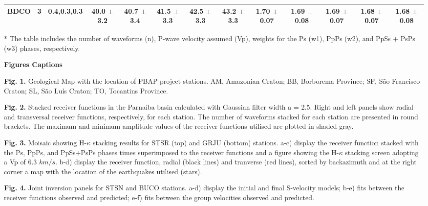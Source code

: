 \documentclass[paper,11pt]{geophysics}
\begin{document}
\begin{landscape}
\begin{table}[! htpb]
\begin{threeparttable}
\begin{tabular}{ccc|ccccc|ccccc}
BDCO & 3 & 0.4,0.3,0.3 & 40.0 $\pm$ 3.2 & 40.7 $\pm$ 3.4 & 41.5 $\pm$ 3.3 & 42.5 $\pm$ 3.3 & 43.2 $\pm$ 3.3  & 1.70 $\pm$ 0.07 & 1.69 $\pm$ 0.08 & 1.69 $\pm$ 0.07 & 1.68 $\pm$ 0.07 & 1.68 $\pm$ 0.08 \\ \hline
\end{tabular}
	\begin{tablenotes}\footnotesize
	\item[*] The table includes the number of waveforms (n), P-wave velocity assumed (Vp), weights for the Ps (w1), PpPs (w2), and PpSs + PsPs (w3) phases, respectively.
    \end{tablenotes}
    \label{tabela_hk_stacking}
	\end{threeparttable}
\end{table}
\end{landscape}



\pagebreak
\begin{flushleft}
\textbf{\LARGE Figures Captions}
\end{flushleft}

\textbf{Fig. 1.} Geological Map with the location of PBAP project stations. AM, Amazonian Craton; BB, Borborema Province; SF, São Francisco Craton; SL, São Luís Craton; TO, Tocantins Province.

\textbf{Fig. 2.} Stacked receiver functions in the Parnaíba basin calculated with Gaussian filter width a = 2.5. Right and left panels show radial and transversal receiver functions, respectively, for each station. The number of waveforms stacked for each station are presented in round brackets. The maximum and minimum amplitude values of the receiver functions utilised are plotted in shaded gray.


\textbf{Fig. 3.} Moisaic showing H-$\kappa$ stacking results for STSR (top) and GRJU (bottom) stations. a-c) display the receiver function stacked with the Ps, PpPs, and PpSs+PsPs phases times superimposed to the receiver functions and a figure showing the H-$\kappa$ stacking screen adopting a Vp of 6.3 $km/s$. b-d) display the receiver function, radial (black lines) and tranverse (red lines), sorted by backazimuth and at the right corner a map with the location of the earthquakes utilised (stars).

\textbf{Fig. 4.} Joint inversion panels for STSN and BUCO stations. a-d) display the initial and final S-velocity models; b-e) fits between the receiver
functions observed and predicted; e-f) fits between the group velocities observed and predicted.
\end{document}
